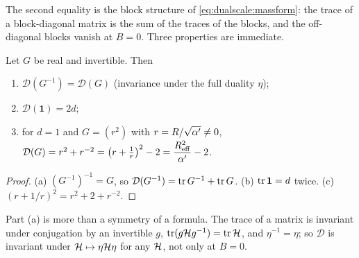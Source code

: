 The second equality is the block structure of \eqref{eq:dualscale:massform}: the trace of a
block-diagonal matrix is the sum of the traces of the blocks, and the off-diagonal blocks
vanish at $B=0$. Three properties are immediate.

\begin{lemma}\label{thm:dualscale:Dprops}
Let $G$ be real and invertible. Then
\begin{enumerate}[label=(\alph*),leftmargin=*]
\item $\mathcal D(G^{-1})=\mathcal D(G)$ (invariance under the full duality $\eta$);
\item $\mathcal D(\mathbf1)=2d$;
\item for $d=1$ and $G=(r^2)$ with $r=R/\sqrt{\alpha'}\ne0$,
 $\mathcal D(G)=r^2+r^{-2}=\big(r+\tfrac1r\big)^2-2=\dfrac{R_{\rm eff}^2}{\alpha'}-2$.
\end{enumerate}
\end{lemma}
\begin{proof}
(a) $(G^{-1})^{-1}=G$, so $\mathcal D(G^{-1})=\operatorname{tr} G^{-1}+\operatorname{tr} G$. (b) $\operatorname{tr}\mathbf1=d$ twice.
(c) $(r+1/r)^2=r^2+2+r^{-2}$.
\end{proof}

Part (a) is more than a symmetry of a formula. The trace of a matrix is invariant under
conjugation by an invertible $g$, $\operatorname{tr}(g\mathcal{H} g^{-1})=\operatorname{tr}\mathcal{H}$, and $\eta^{-1}=\eta$; so
$\mathcal D$ is invariant under $\mathcal{H}\mapsto\eta\mathcal{H}\eta$ for any $\mathcal{H}$, not only at $B=0$.

